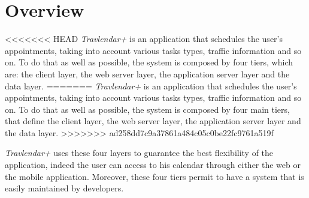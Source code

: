 \section{Overview}
<<<<<<< HEAD
\emph{Travlendar+} is an application that schedules the user's appointments, taking into account various tasks types, traffic information and so on. To do that as well as possible, the system is composed by four tiers, which are: the client layer, the web server layer, the application server layer and the data layer.
=======
\emph{Travlendar+} is an application that schedules the user's appointments, taking into account various tasks types, traffic information and so on. To do that as well as possible, the system is composed by four main tiers, that define the client layer, the web server layer, the application server layer and the data layer.
>>>>>>> ad258dd7c9a37861a484c05c0be22fc9761a519f

\emph{Travlendar+} uses these four layers to guarantee the best flexibility of the application, indeed the user can access to his calendar through either the web or the mobile application. Moreover, these four tiers permit to have a system that is easily maintained by developers.

